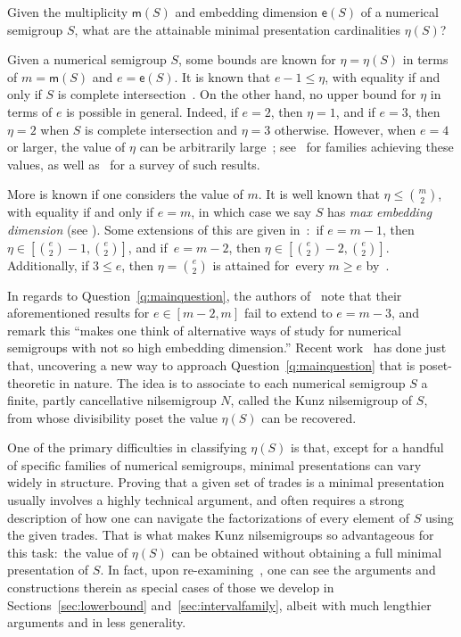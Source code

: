 \documentclass[ALCO]{cedram}
\begin{document}
\begin{question}\label{q:mainquestion}
Given the multiplicity $\mathsf m(S)$ and embedding dimension $\mathsf e(S)$ of a numerical semigroup $S$, what are the attainable minimal presentation cardinalities $\eta(S)$?  
\end{question}

Given a numerical semigroup $S$, some bounds are known for $\eta = \eta(S)$ in terms of $m = \mathsf m(S)$ and $e = \mathsf e(S)$.  It is known that $e - 1 \le \eta$, with equality if and only if $S$ is complete intersection~\cite{completeintersection}.  On the other hand, no upper bound for $\eta$ in terms of $e$ is possible in general.  Indeed, if $e = 2$, then $\eta = 1$, and if $e = 3$, then $\eta = 2$ when $S$ is complete intersection and $\eta = 3$ otherwise.  However, when $e = 4$ or larger, the value of $\eta$ can be arbitrarily large~\cite{primeidealsgenericzero}; see~\cite{monomialcurvecmtype,genericlatticecodim3} for families achieving these values, as well as~\cite{nsbettisurvey} for a survey of such results.  

More is known if one considers the value of $m$.  It is well known that $\eta \le \binom{m}{2}$, with equality if and only if $e = m$, in which case we say $S$ has \emph{max embedding dimension} (see \cite[Section~8.4]{numerical}).  
Some extensions of this are given in~\cite{highembdim}:\ if $e = m - 1$, then $\eta \in [\binom{e}{2} - 1, \binom{e}{2}]$, and if~$e = m - 2$, then $\eta \in [\binom{e}{2} - 2, \binom{e}{2}]$.  Additionally, if $3 \le e$, then $\eta = \binom{e}{2}$ is attained for~every $m \ge e$ by~\cite{rosalesApery}.  

In regards to Question~\ref{q:mainquestion}, the authors of~\cite{highembdim} note that their aforementioned results for $e \in [m-2, m]$ fail to extend to $e = m-3$, and remark this ``makes one think of alternative ways of study for numerical semigroups with not so high embedding dimension.'' 
Recent work~\cite{kunzfaces3} has done just that, uncovering a new way to approach Question~\ref{q:mainquestion} that is poset-theoretic in nature.  The idea is to associate to each numerical semigroup $S$ a finite, partly cancellative nilsemigroup $N$, called the Kunz nilsemigroup of $S$, from whose divisibility poset the value $\eta(S)$ can be recovered.  

One of the primary difficulties in classifying $\eta(S)$ is that, except for a handful of specific families of numerical semigroups, minimal presentations can vary widely in structure.  Proving that a given set of trades is a minimal presentation usually involves a highly technical argument, and often requires a strong description of how one can navigate the factorizations of every element of $S$ using the given trades.  That is what makes Kunz nilsemigroups so advantageous for this task:\ the value of $\eta(S)$ can be obtained without obtaining a full minimal presentation of $S$.  
In fact, upon re-examining~\cite{rosalesApery,highembdim}, one can see the arguments and constructions therein as special cases of those we develop in Sections~\ref{sec:lowerbound} and~\ref{sec:intervalfamily}, albeit with much lengthier arguments and in less generality.  
\end{document}
